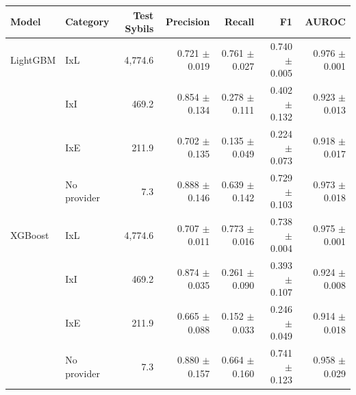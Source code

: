 \begin{tabular}{llrrrrr}
\toprule
Model & Category & Test Sybils & Precision & Recall & F1 & AUROC \\
\midrule
LightGBM & IxL & 4,774.6 & 0.721 $\pm$ 0.019 & 0.761 $\pm$ 0.027 & 0.740 $\pm$ 0.005 & 0.976 $\pm$ 0.001 \\
 & IxI & 469.2 & 0.854 $\pm$ 0.134 & 0.278 $\pm$ 0.111 & 0.402 $\pm$ 0.132 & 0.923 $\pm$ 0.013 \\
 & IxE & 211.9 & 0.702 $\pm$ 0.135 & 0.135 $\pm$ 0.049 & 0.224 $\pm$ 0.073 & 0.918 $\pm$ 0.017 \\
 & No provider & 7.3 & 0.888 $\pm$ 0.146 & 0.639 $\pm$ 0.142 & 0.729 $\pm$ 0.103 & 0.973 $\pm$ 0.018 \\
\midrule
XGBoost & IxL & 4,774.6 & 0.707 $\pm$ 0.011 & 0.773 $\pm$ 0.016 & 0.738 $\pm$ 0.004 & 0.975 $\pm$ 0.001 \\
 & IxI & 469.2 & 0.874 $\pm$ 0.035 & 0.261 $\pm$ 0.090 & 0.393 $\pm$ 0.107 & 0.924 $\pm$ 0.008 \\
 & IxE & 211.9 & 0.665 $\pm$ 0.088 & 0.152 $\pm$ 0.033 & 0.246 $\pm$ 0.049 & 0.914 $\pm$ 0.018 \\
 & No provider & 7.3 & 0.880 $\pm$ 0.157 & 0.664 $\pm$ 0.160 & 0.741 $\pm$ 0.123 & 0.958 $\pm$ 0.029 \\
\bottomrule
\end{tabular}
